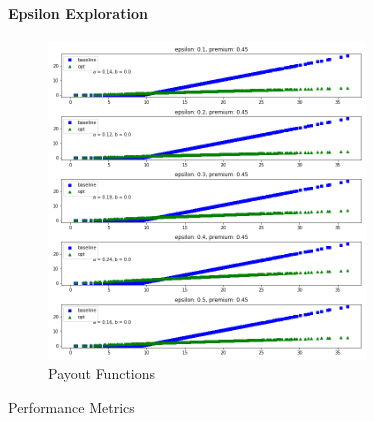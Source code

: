 \documentclass[11pt]{article}
\begin{document}
            \paragraph*{Epsilon Exploration}
                \begin{figure}[H]
                    \centering
                    \caption{Payout Functions}
                    \includegraphics[width=0.75\textwidth]{../../output/figures/CVaR/epsilon_exploration_slope.png}
                \end{figure}

                \begin{table}[H]
                    \centering
                    \caption{Performance Metrics}
                    
                \end{table}

                \FloatBarrier
\end{document}
